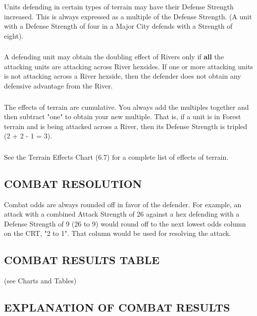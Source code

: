 \subsubsection{} Units defending in certain types of terrain may have their Defense Strength increased. This is always expressed as a multiple of the Defense Strength. (A unit with a Defense Strength of four in a Major City defends with a Strength of eight).

\subsubsection{} A defending unit may obtain the doubling effect of Rivers only if \textbf{all} the attacking units are attacking across River hexsides. If one or more attacking units is not attacking across a River hexside, then the defender does not obtain any defensive advantage from the River.

\subsubsection{} The effects of terrain are cumulative. You always add the multiples together and then subtract "one" to obtain your new multiple. That is, if a unit is in Forest terrain and is being attacked across a River, then its Defense Strength is tripled (2 + 2 - 1 = 3).

\subsubsection{} See the Terrain Effects Chart (6.7) for a complete list of effects of terrain.

\subsection{COMBAT RESOLUTION}

Combat odds are always rounded off in favor of the defender. For example, an attack with a combined Attack Strength of 26 against a hex defending with a Defense Strength of 9 (26 to 9) would round off to the next lowest odds column on the CRT, "2 to 1". That column would be used for resolving the attack.

\subsection{COMBAT RESULTS TABLE} (see Charts and Tables)

\begin{flushleft}
  \subsection{EXPLANATION OF COMBAT RESULTS}
\end{flushleft}

